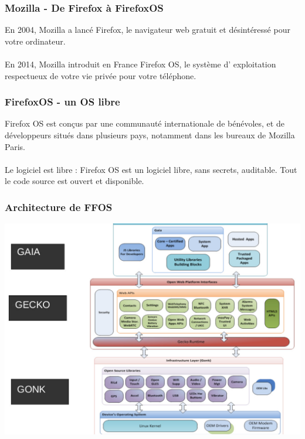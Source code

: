 \documentclass{beamer}
\begin{document}
\begin{frame}
\frametitle{Mozilla - De Firefox à FirefoxOS}
En 2004, Mozilla a lancé Firefox, le navigateur web gratuit et
désintéressé pour votre ordinateur.
\\~\\
En 2014, Mozilla introduit en France Firefox OS, le système d’
exploitation respectueux de votre vie privée pour votre téléphone.
\end{frame}
\begin{frame}
\frametitle{FirefoxOS - un OS libre}
Firefox OS est conçus par une communauté internationale de bénévoles, et de développeurs situés dans plusieurs pays, notamment dans les bureaux de Mozilla Paris.
\\~\\
Le logiciel est libre : Firefox OS est un logiciel libre, sans secrets, auditable. Tout le code source est ouvert et disponible.
\end{frame}
\begin{frame}
\frametitle{Architecture de FFOS}
\begin{center}
\includegraphics[scale=0.3]{./images/ffos_architecture.jpg}
\end{center}
\end{frame}
\end{document}

